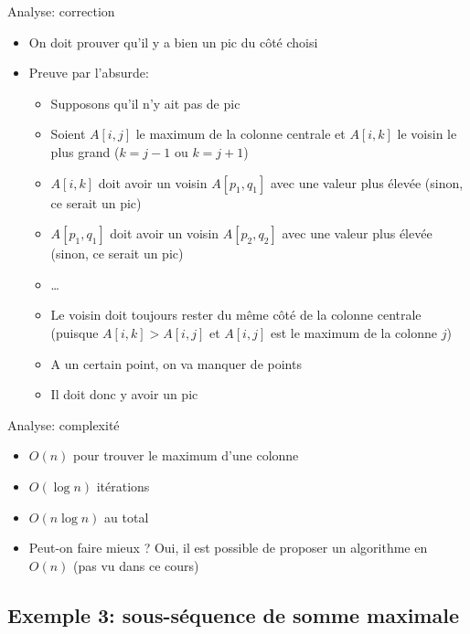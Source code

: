 \begin{frame}{Analyse: correction}

\begin{itemize}
\item On doit prouver qu'il y a bien un pic du côté choisi
\item Preuve par l'absurde:
\begin{itemize}
\item Supposons qu'il n'y ait pas de pic
\item Soient $A[i,j]$ le maximum de la colonne centrale et $A[i,k]$ le voisin le plus grand ($k=j-1$ ou $k=j+1$)
\item $A[i,k]$ doit avoir un voisin $A[p_1,q_1]$ avec une valeur plus élevée (sinon, ce serait un pic)
\item $A[p_1,q_1]$ doit avoir un voisin $A[p_2,q_2]$ avec une valeur plus élevée (sinon, ce serait un pic)
\item \ldots
\item Le voisin doit toujours rester du même côté de la colonne
  centrale (puisque $A[i,k]>A[i,j]$ et $A[i,j]$ est le maximum de la
  colonne $j$)
\item A un certain point, on va manquer de points
\item Il doit donc y avoir un pic
\end{itemize}
\end{itemize}

\end{frame}

\begin{frame}{Analyse: complexité}

\begin{itemize}
\item $O(n)$ pour trouver le maximum d'une colonne
\item $O(\log n)$ itérations
\item $O(n\log n)$ au total
\bigskip

\item Peut-on faire mieux ? Oui, il est possible de proposer un algorithme en $O(n)$ (pas vu dans ce cours)
\end{itemize}

\end{frame}

\subsection{Exemple 3: sous-séquence de somme maximale}

